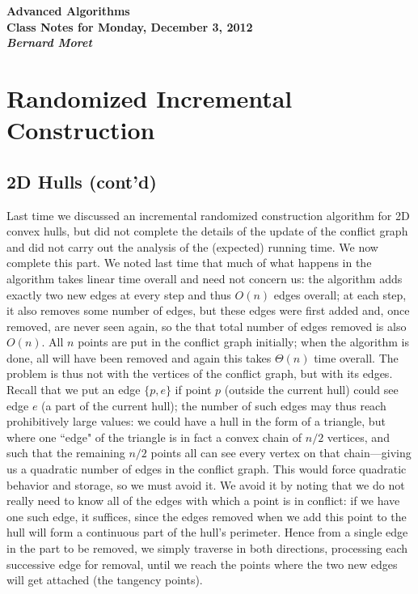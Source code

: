 \documentclass[11pt]{article}
\begin{document}
\begin{center}
  \LARGE\bf Advanced Algorithms\\

  \Large\sf
  Class Notes for Monday, December 3, 2012\\

  \it
  Bernard Moret
\end{center}

\bigskip

\section{Randomized Incremental Construction}

\subsection{2D Hulls (cont'd)}
Last time we discussed an incremental randomized construction algorithm
for 2D convex hulls, but did not complete the details of the update of
the conflict graph and did not carry out the analysis of the (expected) running
time.   We now complete this part.  We noted last time that much of what happens
in the algorithm takes linear time overall and need not concern us:
the algorithm adds exactly two new edges at every step and thus $O(n)$
edges overall; at each step, it also removes some number of edges, but
these edges were first added and, once removed, are never seen again,
so the that total number of edges removed is also $O(n)$. All $n$ points
are put in the conflict graph initially; when the algorithm is done, all
will have been removed and again this takes $\Theta(n)$ time overall.
The problem is thus not with the vertices of the conflict graph, but with
its edges.  Recall that we put an edge $\{p,e\}$ if point $p$ (outside
the current hull) could see edge $e$ (a part of the current hull); the
number of such edges may thus reach prohibitively large values: we could
have a hull in the form of a triangle, but where one ``edge" of the triangle
is in fact a convex chain of $n/2$ vertices, and such that the remaining
$n/2$ points all can see every vertex on that chain---giving us a quadratic
number of edges in the conflict graph.  This would force quadratic behavior
and storage, so we must avoid it.  We avoid it by noting that we do not really
need to know all of the edges with which a point is in conflict: if we have one
such edge, it suffices, since the edges removed when we add this point to the
hull will form a continuous part of the hull's perimeter.  Hence from a single
edge in the part to be removed, we simply traverse in both directions,
processing each successive edge for removal, until we reach the points where
the two new edges will get attached (the tangency points).
\end{document}
